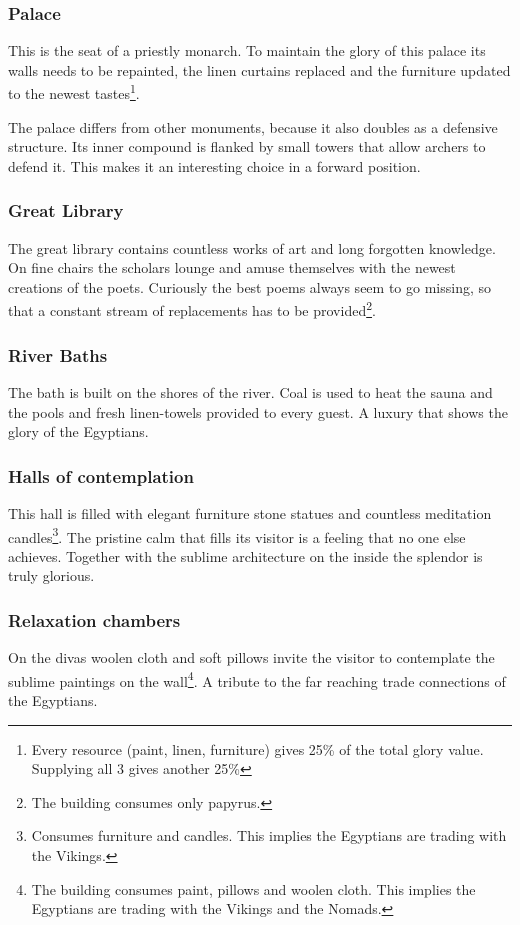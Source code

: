 \documentclass[a4paper]{book}
\begin{document}
		\subsubsection{Palace}
			This is the seat of a priestly monarch.
			To maintain the glory of this palace its walls needs to be repainted,
			the linen curtains replaced and the furniture updated to the newest tastes\footnote{
				Every resource (paint, linen, furniture) gives 25\% of the total glory value.
				Supplying all 3 gives another 25\%
			}.

			The palace differs from other monuments, because it also doubles as a defensive
			structure.
			Its inner compound is flanked by small towers that allow archers to defend it.
			This makes it an interesting choice in a forward position.

		\subsubsection{Great Library}
			The great library contains countless works of art and long forgotten knowledge.
			On fine chairs the scholars lounge and amuse themselves with the newest creations
			of the poets.
			Curiously the best poems always seem to go missing, so that a constant stream
			of replacements has to be provided\footnote{
				The building consumes only papyrus.
			}.

		\subsubsection{River Baths}
			The bath is built on the shores of the river.
			Coal is used to heat the sauna and the pools and fresh linen-towels
			provided to every guest.
			A luxury that shows the glory of the \gls{Egyptians}.

		\subsubsection{Halls of contemplation}
			This hall is filled with elegant furniture stone statues and countless meditation
			candles\footnote{
				Consumes furniture and candles.
				This implies the \gls{Egyptians} are trading with the \gls{Vikings}.
			}.
			The pristine calm that fills its visitor is a feeling that no one else achieves.
			Together with the sublime architecture on the inside the splendor is truly glorious.

		\subsubsection{Relaxation chambers}
			On the divas woolen cloth and soft pillows invite the visitor to contemplate
			the sublime paintings on the wall\footnote{
				The building consumes paint, pillows and woolen cloth.
				This implies the \gls{Egyptians} are trading with the \gls{Vikings}
				and the \gls{Nomads}.
			}.
			A tribute to the far reaching trade connections of the \gls{Egyptians}.
\end{document}
